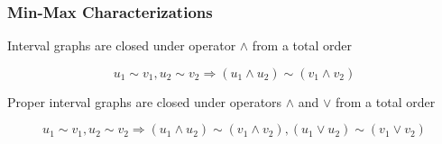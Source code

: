 \documentclass[a4paper,handout]{beamer}
\theoremstyle{definition}
\begin{document}
\begin{frame}
\frametitle{Min-Max Characterizations}
\begin{block}{}
Interval graphs are closed under operator \(\wedge\) from a total order
\end{block}
\begin{exampleblock}{}
\vspace{-6pt}
\[u_1 \sim v_1, u_2 \sim v_2 \Rightarrow (u_1 \wedge u_2) \sim (v_1 \wedge v_2)\]
\end{exampleblock}
\pause
\begin{center}
\end{center}
\pause
\pause
\vskip 12pt
\begin{block}{}
Proper interval graphs are closed under operators \(\wedge\) and \(\vee\) from a total order
\end{block}
\begin{exampleblock}{}
\vspace{-18pt}
\[u_1 \sim v_1, u_2 \sim v_2 \Rightarrow (u_1 \wedge u_2) \sim (v_1 \wedge v_2), (u_1 \vee u_2) \sim (v_1 \vee v_2)\]
\end{exampleblock}
\end{frame}
\end{document}
